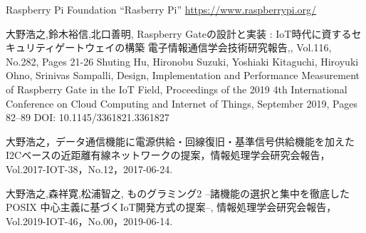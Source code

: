 

\begin{thebibliography}{2}

  Raspberry Pi Foundation ``Rasberry Pi''
  \url{https://www.raspberrypi.org/}



大野浩之,鈴木裕信,北口善明,
Raspberry Gateの設計と実装 : IoT時代に資するセキュリティゲートウェイの構築
電子情報通信学会技術研究報告,,
Vol.116, No.282, Pages 21-26
Shuting Hu, Hironobu Suzuki, Yoshiaki Kitaguchi, Hiroyuki Ohno, Srinivas Sampalli,
Design, Implementation and Performance Measurement of Raspberry Gate in the IoT Field,
Proceedings of the 2019 4th International Conference on Cloud Computing and Internet of Things, September 2019, Pages 82–89
DOI: 10.1145/3361821.3361827

  大野浩之，データ通信機能に電源供給・回線復旧・基準信号供給機能を加えたI2Cベースの近距離有線ネットワークの提案，情報処理学会研究会報告，Vol.2017-IOT-38，No.12，2017-06-24.

  大野浩之,森祥寛,松浦智之,  ものグラミング2 --諸機能の選択と集中を徹底したPOSIX 中心主義に基づくIoT開発方式の提案--, 情報処理学会研究会報告，Vol.2019-IOT-46，No.00，2019-06-14.


\end{thebibliography}
